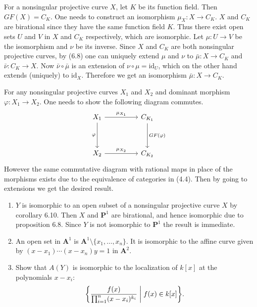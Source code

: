 \documentclass{note}
\newcommand{\Affine}[1]{\mathbf{A}^{#1}}
\newcommand{\Proj}[1]{\mathbf{P}^{#1}}
\newcommand{\id}{\mathrm{id}}
\begin{document}
For a nonsingular projective curve $X$, let $K$ be its function
field. Then $GF(X) = C_K$. One needs to construct an isomorphism
$\mu_X\colon X\to C_K$. $X$ and $C_K$ are birational since they have
the same function field $K$. Thus there exist open sets $U$ and $V$ in
$X$ and $C_K$ respectively, which are isomorphic. Let
$\mu\colon U\to V$ be the isomorphism and $\nu$ be its inverse. Since
$X$ and $C_K$ are both nonsingular projective curves, by (6.8) one can
uniquely extend $\mu$ and $\nu$ to $\bar\mu\colon X\to C_K$ and
$\bar\nu\colon C_K\to X$. Now $\bar\nu\circ\bar\mu$ is an extension of
$\nu\circ\mu = \id_U$, which on the other hand extends (uniquely) to
$\id_X$. Therefore we get an isomorphism $\bar\mu\colon X\to C_K$.

For any nonsingular projective curves $X_1$ and $X_2$ and dominant
morphism $\varphi\colon X_1\to X_2$. One needs to show the following
diagram commutes.
\begin{equation*}
  \begin{tikzcd}[row sep=huge,column sep=huge]
    X_1 \arrow{r}{\mu_{X_1}} \arrow[swap]{d}{\varphi} & C_{K_1}
    \arrow{d}{GF(\varphi)} \\%
    X_2 \arrow{r}{\mu_{X_2}} & C_{K_2}
  \end{tikzcd}
\end{equation*}
However the same commutative diagram with rational maps in place of
the morphisms exists due to the equivalence of categories in
(4.4). Then by going to extensions we get the desired result.

\begin{enumerate}
\item $Y$ is isomorphic to an open subset of a nonsingular projective
  curve $X$ by corollary 6.10. Then $X$ and $\Proj1$ are birational,
  and hence isomorphic due to proposition 6.8. Since $Y$ is not
  isomorphic to $\Proj1$ the result is immediate.
\item An open set in $\Affine1$ is
  $\Affine1\setminus\{x_1,\dots,x_n\}$. It is isomorphic to the affine
  curve given by $(x-x_1)\cdots(x-x_n)y=1$ in $\Affine2$.
\item Show that $A(Y)$ is isomorphic to the localization of $k[x]$ at
  the polynomials $x-x_i\colon$
  \begin{equation*}
    \left\{ \frac{f(x)}{\prod_{i=1}^n(x-x_i)^{k_i}} \biggm\vert
      f(x) \in k[x] \right\}.
  \end{equation*}
\end{enumerate}
\end{document}
